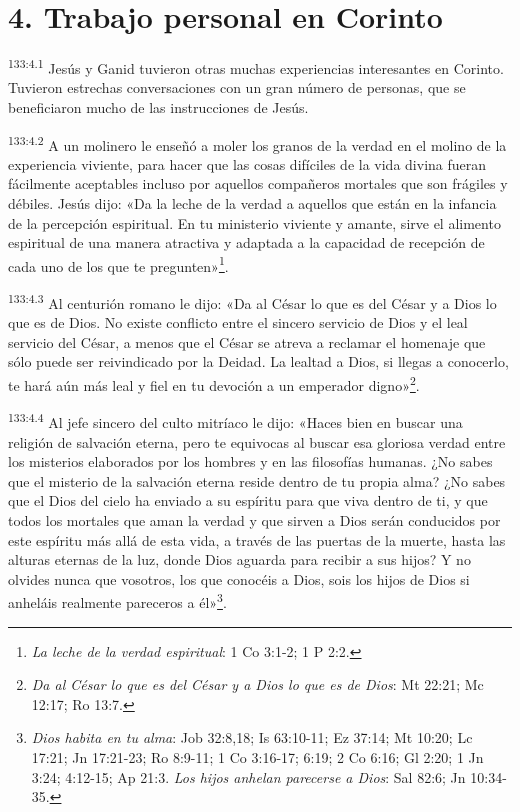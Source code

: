 \section*{4. Trabajo personal en Corinto}
\par 
\textsuperscript{133:4.1} Jesús y Ganid tuvieron otras muchas experiencias interesantes en Corinto. Tuvieron estrechas conversaciones con un gran número de personas, que se beneficiaron mucho de las instrucciones de Jesús.

\par 
\textsuperscript{133:4.2} A un molinero le enseñó a moler los granos de la verdad en el molino de la experiencia viviente, para hacer que las cosas difíciles de la vida divina fueran fácilmente aceptables incluso por aquellos compañeros mortales que son frágiles y débiles. Jesús dijo: «Da la leche de la verdad a aquellos que están en la infancia de la percepción espiritual. En tu ministerio viviente y amante, sirve el alimento espiritual de una manera atractiva y adaptada a la capacidad de recepción de cada uno de los que te pregunten»\footnote{\textit{La leche de la verdad espiritual}: 1 Co 3:1-2; 1 P 2:2.}.

\par 
\textsuperscript{133:4.3} Al centurión romano le dijo: «Da al César lo que es del César y a Dios lo que es de Dios. No existe conflicto entre el sincero servicio de Dios y el leal servicio del César, a menos que el César se atreva a reclamar el homenaje que sólo puede ser reivindicado por la Deidad. La lealtad a Dios, si llegas a conocerlo, te hará aún más leal y fiel en tu devoción a un emperador digno»\footnote{\textit{Da al César lo que es del César y a Dios lo que es de Dios}: Mt 22:21; Mc 12:17; Ro 13:7.}.

\par 
\textsuperscript{133:4.4} Al jefe sincero del culto mitríaco le dijo: «Haces bien en buscar una religión de salvación eterna, pero te equivocas al buscar esa gloriosa verdad entre los misterios elaborados por los hombres y en las filosofías humanas. ¿No sabes que el misterio de la salvación eterna reside dentro de tu propia alma? ¿No sabes que el Dios del cielo ha enviado a su espíritu para que viva dentro de ti, y que todos los mortales que aman la verdad y que sirven a Dios serán conducidos por este espíritu más allá de esta vida, a través de las puertas de la muerte, hasta las alturas eternas de la luz, donde Dios aguarda para recibir a sus hijos? Y no olvides nunca que vosotros, los que conocéis a Dios, sois los hijos de Dios si anheláis realmente pareceros a él»\footnote{\textit{Dios habita en tu alma}: Job 32:8,18; Is 63:10-11; Ez 37:14; Mt 10:20; Lc 17:21; Jn 17:21-23; Ro 8:9-11; 1 Co 3:16-17; 6:19; 2 Co 6:16; Gl 2:20; 1 Jn 3:24; 4:12-15; Ap 21:3. \textit{Los hijos anhelan parecerse a Dios}: Sal 82:6; Jn 10:34-35.}.

